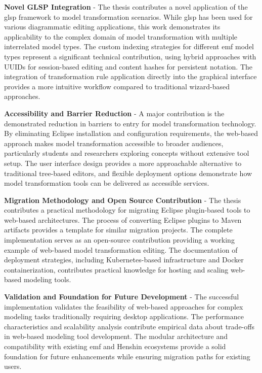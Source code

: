   \textbf{Novel GLSP Integration} - The thesis contributes a novel application of the \ac{glsp} framework to model transformation scenarios. While \ac{glsp} has been used for various diagrammatic editing applications, this work demonstrates its applicability to the complex domain of model transformation with multiple interrelated model types. The custom indexing strategies for different \ac{emf} model types represent a significant technical contribution, using hybrid approaches with UUIDs for session-based editing and content hashes for persistent notation. The integration of transformation rule application directly into the graphical interface provides a more intuitive workflow compared to traditional wizard-based approaches.

  \textbf{Accessibility and Barrier Reduction} - A major contribution is the demonstrated reduction in barriers to entry for model transformation technology. By eliminating Eclipse installation and configuration requirements, the web-based approach makes model transformation accessible to broader audiences, particularly students and researchers exploring concepts without extensive tool setup. The user interface design provides a more approachable alternative to traditional tree-based editors, and flexible deployment options demonstrate how model transformation tools can be delivered as accessible services.

  \textbf{Migration Methodology and Open Source Contribution} - The thesis contributes a practical methodology for migrating Eclipse plugin-based tools to web-based architectures. The process of converting Eclipse plugins to Maven artifacts provides a template for similar migration projects. The complete implementation serves as an open-source contribution providing a working example of web-based model transformation editing. The documentation of deployment strategies, including Kubernetes-based infrastructure and Docker containerization, contributes practical knowledge for hosting and scaling web-based modeling tools.

  \textbf{Validation and Foundation for Future Development} - The successful implementation validates the feasibility of web-based approaches for complex modeling tasks traditionally requiring desktop applications. The performance characteristics and scalability analysis contribute empirical data about trade-offs in web-based modeling tool development. The modular architecture and compatibility with existing \ac{emf} and Henshin ecosystems provide a solid foundation for future enhancements while ensuring migration paths for existing users.

